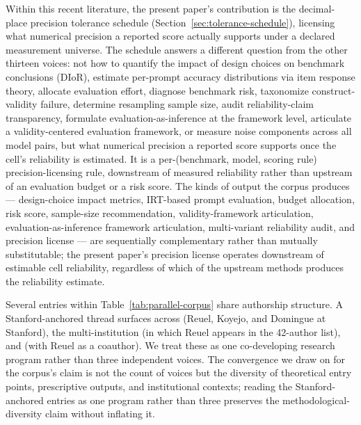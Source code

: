 \documentclass[11pt]{article}
\begin{document}
Within this recent literature, the present paper's contribution is the decimal-place precision tolerance schedule (Section~\ref{sec:tolerance-schedule}), licensing what numerical precision a reported score actually supports under a declared measurement universe. The schedule answers a different question from the other thirteen voices: not how to quantify the impact of design choices on benchmark conclusions (DIoR), estimate per-prompt accuracy distributions via item response theory, allocate evaluation effort, diagnose benchmark risk, taxonomize construct-validity failure, determine resampling sample size, audit reliability-claim transparency, formulate evaluation-as-inference at the framework level, articulate a validity-centered evaluation framework, or measure noise components across all model pairs, but what numerical precision a reported score supports once the cell's reliability is estimated. It is a per-(benchmark, model, scoring rule) precision-licensing rule, downstream of measured reliability rather than upstream of an evaluation budget or a risk score. The kinds of output the corpus produces --- design-choice impact metrics, IRT-based prompt evaluation, budget allocation, risk score, sample-size recommendation, validity-framework articulation, evaluation-as-inference framework articulation, multi-variant reliability audit, and precision license --- are sequentially complementary rather than mutually substitutable; the present paper's precision license operates downstream of estimable cell reliability, regardless of which of the upstream methods produces the reliability estimate.

Several entries within Table~\ref{tab:parallel-corpus} share authorship structure. A Stanford-anchored thread surfaces across \citet{salaudeen2025measurement} (Reuel, Koyejo, and Domingue at Stanford), the multi-institution \citet{bean2025measuring} (in which Reuel appears in the 42-author list), and \citet{mcgregor2025benchrisk} (with Reuel as a coauthor). We treat these as one co-developing research program rather than three independent voices. The convergence we draw on for the corpus's claim is not the count of voices but the diversity of theoretical entry points, prescriptive outputs, and institutional contexts; reading the Stanford-anchored entries as one program rather than three preserves the methodological-diversity claim without inflating it.
\end{document}
